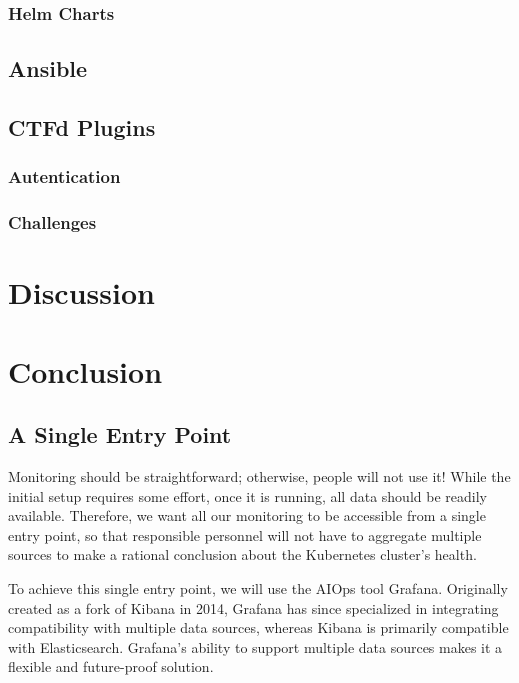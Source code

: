 \subsection{Helm Charts}

\section{Ansible}

\section{CTFd Plugins}
\subsection{Autentication}
\subsection{Challenges}

\chapter{Discussion}

\chapter{Conclusion}

\cleardoublepage
{}
{}
\printbibliography


\section{A Single Entry Point}
Monitoring should be straightforward; otherwise, people will not use it! While the initial setup requires some effort, once it is running, all data should be readily available. Therefore, we want all our monitoring to be accessible from a single entry point, so that responsible personnel will not have to aggregate multiple sources to make a rational conclusion about the Kubernetes cluster's health.

To achieve this single entry point, we will use the AIOps tool Grafana. Originally created as a fork of Kibana in 2014, Grafana has since specialized in integrating compatibility with multiple data sources, whereas Kibana is primarily compatible with Elasticsearch. Grafana's ability to support multiple data sources makes it a flexible and future-proof solution.

